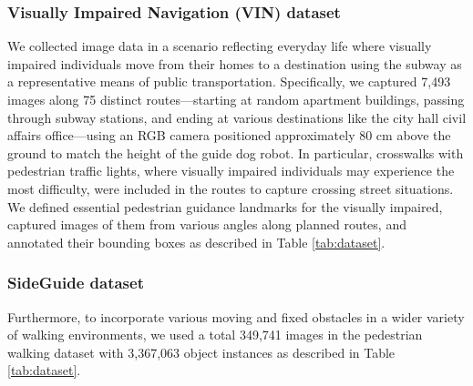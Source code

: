 \subsubsection{Visually Impaired Navigation (VIN) dataset}
We collected image data in a scenario reflecting everyday life where visually impaired individuals move from their homes to a destination using the subway as a representative means of public transportation.
Specifically, we captured 7,493 images along 75 distinct routes—starting at random apartment buildings, passing through subway stations, and ending at various destinations like the city hall civil affairs office—using an RGB camera positioned approximately 80 cm above the ground to match the height of the guide dog robot.
In particular, crosswalks with pedestrian traffic lights, where visually impaired individuals may experience the most difficulty, were included in the routes to capture crossing street situations.
We defined essential pedestrian guidance landmarks for the visually impaired, captured images of them from various angles along planned routes, and annotated their bounding boxes as described in Table \ref{tab:dataset}.

\subsubsection{SideGuide dataset} Furthermore, to incorporate various moving and fixed obstacles in a wider variety of walking environments, we used a total 349,741 images in the pedestrian walking dataset with 3,367,063 object instances \cite{Kibaek2020} as described in Table \ref{tab:dataset}.

